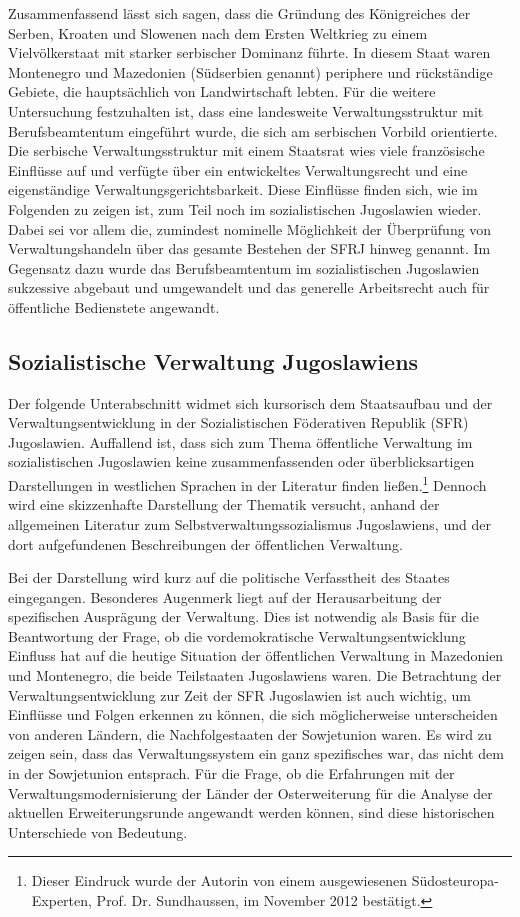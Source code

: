 Zusammenfassend lässt sich sagen, dass die Gründung des Königreiches der Serben, Kroaten und Slowenen nach dem Ersten Weltkrieg zu einem Vielvölkerstaat mit starker serbischer Dominanz führte. In diesem Staat waren Montenegro und Mazedonien (Südserbien genannt) periphere und rückständige Gebiete, die hauptsächlich von Landwirtschaft lebten. Für die weitere Untersuchung festzuhalten ist, dass eine landesweite Verwaltungsstruktur mit Berufsbeamtentum eingeführt wurde, die sich am serbischen Vorbild orientierte. Die serbische Verwaltungsstruktur mit einem Staatsrat wies viele französische Einflüsse auf und verfügte über ein entwickeltes Verwaltungsrecht und eine eigenständige Verwaltungsgerichtsbarkeit. Diese Einflüsse finden sich, wie im Folgenden zu zeigen ist, zum Teil noch im sozialistischen Jugoslawien wieder. Dabei sei vor allem die, zumindest nominelle Möglichkeit der Überprüfung von Verwaltungshandeln über das gesamte Bestehen der SFRJ hinweg genannt. Im Gegensatz dazu wurde das Berufsbeamtentum im sozialistischen Jugoslawien sukzessive abgebaut und umgewandelt und das generelle Arbeitsrecht auch für öffentliche Bedienstete angewandt.


\subsection{Sozialistische Verwaltung Jugoslawiens}
Der folgende Unterabschnitt widmet sich kursorisch dem Staatsaufbau und der Verwaltungsentwicklung in der Sozialistischen Föderativen Republik (SFR) Jugoslawien. Auffallend ist, dass sich zum Thema öffentliche Verwaltung im sozialistischen Jugoslawien keine zusammenfassenden oder überblicksartigen Darstellungen in westlichen Sprachen in der Literatur finden ließen.\footnote{Dieser Eindruck wurde der Autorin von einem ausgewiesenen Südosteuropa-Experten, Prof. Dr. Sundhaussen, im November 2012 bestätigt.} Dennoch wird eine skizzenhafte Darstellung der Thematik versucht, anhand der allgemeinen Literatur zum Selbstverwaltungssozialismus Jugoslawiens, und der dort aufgefundenen Beschreibungen der öffentlichen Verwaltung. \par
Bei der Darstellung wird kurz auf die politische Verfasstheit des Staates eingegangen. Besonderes Augenmerk liegt auf der Herausarbeitung der spezifischen Ausprägung der Verwaltung. Dies ist notwendig als Basis für die Beantwortung der Frage, ob die vordemokratische Verwaltungsentwicklung Einfluss hat auf die heutige Situation der öffentlichen Verwaltung in Mazedonien und Montenegro, die beide Teilstaaten Jugoslawiens waren. Die Betrachtung der Verwaltungsentwicklung zur Zeit der SFR Jugoslawien ist auch wichtig, um Einflüsse und Folgen erkennen zu können, die sich möglicherweise unterscheiden von anderen Ländern, die Nachfolgestaaten der Sowjetunion waren. Es wird zu zeigen sein, dass das Verwaltungssystem ein ganz spezifisches war, das nicht dem in der Sowjetunion entsprach. Für die Frage, ob die Erfahrungen mit der Verwaltungsmodernisierung der Länder der Osterweiterung für die Analyse der aktuellen Erweiterungsrunde angewandt werden können, sind diese historischen Unterschiede von Bedeutung.


